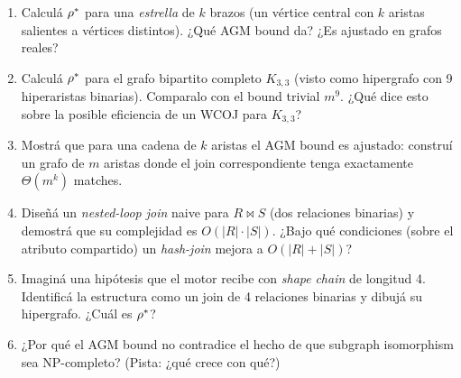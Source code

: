 \begin{ejercicios}
\begin{enumerate}
    \item \starred{} Calculá \(\rho^{*}\) para una \emph{estrella}
    de \(k\) brazos (un vértice central con \(k\) aristas salientes a
    vértices distintos). ¿Qué AGM bound da? ¿Es ajustado en grafos
    reales?

    \item Calculá \(\rho^{*}\) para el grafo bipartito completo
    \(K_{3,3}\) (visto como hipergrafo con 9 hiperaristas binarias).
    Comparalo con el bound trivial \(m^9\). ¿Qué dice esto sobre la
    posible eficiencia de un WCOJ para \(K_{3,3}\)?

    \item \starred{} Mostrá que para una cadena de \(k\) aristas
    el AGM bound es ajustado: construí un grafo de \(m\) aristas
    donde el join correspondiente tenga exactamente \(\Theta(m^k)\)
    matches.

    \item Diseñá un \emph{nested-loop join} naive para
    \(R \bowtie S\) (dos relaciones binarias) y demostrá que su
    complejidad es \(O(|R| \cdot |S|)\). ¿Bajo qué condiciones
    (sobre el atributo compartido) un \emph{hash-join} mejora a
    \(O(|R| + |S|)\)?

    \item Imaginá una hipótesis que el motor recibe con
    \emph{shape} \emph{chain} de longitud 4. Identificá la
    estructura como un join de 4 relaciones binarias y dibujá su
    hipergrafo. ¿Cuál es \(\rho^{*}\)?

    \item ¿Por qué el AGM bound no contradice el hecho de que
    subgraph isomorphism sea NP-completo? (Pista: ¿qué crece con
    qué?)
\end{enumerate}
\end{ejercicios}
